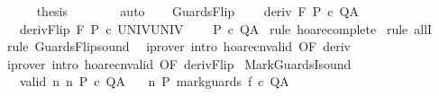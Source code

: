 \begin{isabellebody}
\ \ \ \ \isamarkupfalse%
\ {\isacharquery}thesis\isanewline
\ \ \ \ \ \ \isamarkupfalse%
\ auto\isanewline
\ \ \isamarkupfalse%
\isanewline
{}\isamarkupfalse%
%
\endisatagproof
{\isafoldproof}%
%
\isadelimproof
\isanewline
%
\endisadelimproof
\isanewline
{}\isamarkupfalse%
\ GuardsFlip{\isacharcolon}\ \isanewline
\ \ \ deriv{\isacharcolon}\ {\isachardoublequoteopen}{\isasymGamma}{\isacharcomma}{\isasymTheta}{\isasymturnstile}\isactrlbsub {\isacharslash}F\isactrlesub \ P\ c\ Q{\isacharcomma}A{\isachardoublequoteclose}\isanewline
\ \ \ derivFlip{\isacharcolon}\ {\isachardoublequoteopen}{\isasymGamma}{\isacharcomma}{\isasymTheta}{\isasymturnstile}\isactrlbsub {\isacharslash}{\isacharminus}F\isactrlesub \ P\ c\ UNIV{\isacharcomma}UNIV{\isachardoublequoteclose}\isanewline
\ \ \ {\isachardoublequoteopen}{\isasymGamma}{\isacharcomma}{\isasymTheta}{\isasymturnstile}\isactrlbsub {\isacharslash}{\isacharbraceleft}{\isacharbraceright}\isactrlesub \ P\ c\ Q{\isacharcomma}A{\isachardoublequoteclose}\isanewline
%
\isadelimproof
%
\endisadelimproof
%
\isatagproof
{}\isamarkupfalse%
\ {\isacharparenleft}rule\ hoare{\isacharunderscore}complete{\isacharprime}{\isacharparenright}\isanewline
{}\isamarkupfalse%
\ {\isacharparenleft}rule\ allI{\isacharparenright}\isanewline
{}\isamarkupfalse%
\ {\isacharparenleft}rule\ GuardsFlip{\isacharunderscore}sound{\isacharparenright}\isanewline
{}\isamarkupfalse%
\ \ {\isacharparenleft}iprover\ intro{\isacharcolon}\ hoare{\isacharunderscore}cnvalid\ {\isacharbrackleft}OF\ deriv{\isacharbrackright}{\isacharparenright}\isanewline
{}\isamarkupfalse%
\ {\isacharparenleft}iprover\ intro{\isacharcolon}\ hoare{\isacharunderscore}cnvalid\ {\isacharbrackleft}OF\ derivFlip{\isacharbrackright}{\isacharparenright}\isanewline
{}\isamarkupfalse%
%
\endisatagproof
{\isafoldproof}%
%
\isadelimproof
\isanewline
%
\endisadelimproof
\isanewline
{}\isamarkupfalse%
\ MarkGuardsI{\isacharunderscore}sound{\isacharcolon}\ \isanewline
\ \ \ valid{\isacharcolon}\ {\isachardoublequoteopen}{\isasymforall}n{\isachardot}\ {\isasymGamma}{\isacharcomma}{\isasymTheta}{\isasymTurnstile}n{\isacharcolon}\isactrlbsub {\isacharslash}{\isacharbraceleft}{\isacharbraceright}\isactrlesub \ P\ c\ Q{\isacharcomma}A{\isachardoublequoteclose}\isanewline
\ \ \ {\isachardoublequoteopen}{\isasymGamma}{\isacharcomma}{\isasymTheta}{\isasymTurnstile}n{\isacharcolon}\isactrlbsub {\isacharslash}{\isacharbraceleft}{\isacharbraceright}\isactrlesub \ P\ mark{\isacharunderscore}guards\ f\ c\ Q{\isacharcomma}A{\isachardoublequoteclose}\isanewline

\end{isabellebody}
